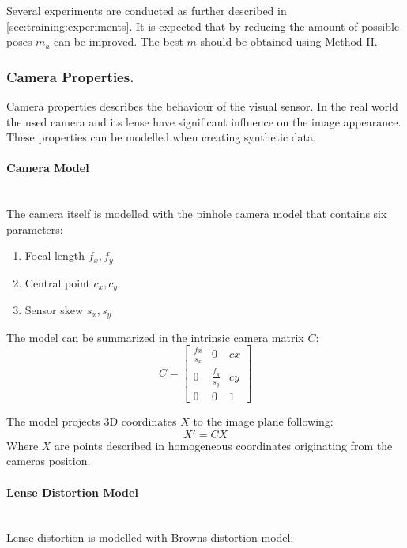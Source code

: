 Several experiments are conducted as further described in \autoref{sec:training:experiments}. It is expected that by reducing the amount of possible poses $m_a$ can be improved. The best $m$ should be obtained using Method II.

\subsubsection{Camera Properties.} 

Camera properties describes the behaviour of the visual sensor. In the real world the used camera and its lense have significant influence on the image appearance. These properties can be modelled when creating synthetic data. 

\paragraph{Camera Model}

\hfill \\
The camera itself is modelled with the pinhole camera model that contains six parameters:

\begin{enumerate}
	\item Focal length $f_x,f_y$
	\item Central point $c_x,c_y$
	\item Sensor skew $s_x, s_y$
\end{enumerate}

The model can be summarized in the intrinsic camera matrix $C$:
\begin{equation}
	C = \begin{bmatrix}
	\frac{fx}{s_x} & 0 &cx \\
	0&  \frac{f_y}{s_y}&cy \\
	0& 	0&	1
	\end{bmatrix}
	\label{eq:pinhole1} 
\end{equation} 

The model projects 3D coordinates $X$ to the image plane following:
\begin{equation}
	X' = C X
	\label{eq:pinhole2}
\end{equation}
Where $X$ are points described in homogeneous coordinates originating from the cameras position.

\paragraph{Lense Distortion Model}\hfill \\
Lense distortion is modelled with Browns distortion model:

